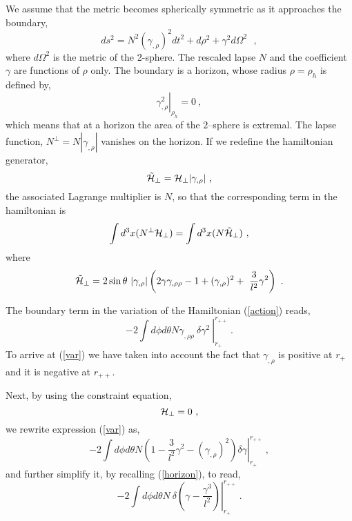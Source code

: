 \documentclass[a4paper,preprintnumbers,amsmath,amssymb]{revtex4}
\begin{document}
 We assume that  the metric  becomes spherically symmetric as it approaches the boundary,
\begin{equation}
ds^2= N^2 (\gamma_{,\rho})^2 dt^2 + d\rho^2 + \gamma^2 d\Omega^2 \ \ \ , \label{boundaryform}
\end{equation}
where $d\Omega^2$ is the metric of the 2-sphere. The rescaled lapse $N$ and the coefficient
$\gamma$ are functions of $\rho$ only. The boundary is a horizon, whose radius $\rho=\rho_h$ is defined by,
\begin{equation}
\left.\gamma^2_{,\rho} \right|_{\rho_h} = 0 \ ,
\label{horizon}
\end{equation}
which means that at a horizon the area of the $2$--sphere is extremal.
The lapse function, $N^{\perp}= N |\gamma_{,\rho}|$ vanishes on the horizon.
If we redefine the hamiltonian generator,
\begin{equation}
\tilde{{\cal H}}_{\perp} = {\cal H}_{\perp}   |\gamma_{,\rho}|  \ ,
\label{ham}
\end{equation}
the associated Lagrange multiplier is $N$, so that the
corresponding term in the hamiltonian is
\begin{equation}
\int d^3 x(N^{\perp}{\cal H}_{\perp}) =  \int d^3 x(N{\tilde{\cal H}}_{\perp}) \ ,
\label{action}
\end{equation}
where
\begin{equation}
\tilde{{\cal H}}_\perp
= 2\sin\theta\   |\gamma_{,\rho}|  \left(2\gamma\gamma_{,\rho\rho} - 1 + (\gamma_{ ,\rho})^2 + \
\frac{3}{l^2}\gamma^2\right)  \ .
\label{cons}
\end{equation}

 The  boundary term in the variation of the Hamiltonian (\ref{action})  reads,
\begin{equation}
\left.
-2 \int d\phi d\theta N \gamma_{,\rho\rho} \ \delta
\gamma^2 \ \right|^{r_{++}}_{r_+} \  .
\label{var}
\end{equation}
To arrive at  (\ref{var}) we have taken into account the fact that $\gamma_{,\rho}$
is positive at $r_{+}$ and it is negative at $r_{++}$.

Next, by using the constraint equation,
\begin{equation}
{\cal H}_\perp = 0  \ ,
\label{constraint}
\end{equation}
we rewrite expression  (\ref{var}) as,
\begin{equation}
\left. -2 \int d\phi d\theta N \left(1-\frac{3}{l^2}\gamma^2 -
(\gamma_{,\rho})^2 \right)  \delta \gamma \right|^{r_{++}}_{r_+}  \ ,
\label{var2}
\end{equation}
and  further simplify it, by recalling (\ref{horizon}), to read,
\begin{equation}
 \left. - 2 \int d\phi d\theta  N \  \delta \left( \gamma - \frac{\gamma^3}{l^2} \right)
 \right|^{r_{++}}_{r_+}  \ .
\label{var3}
\end{equation}
\end{document}
